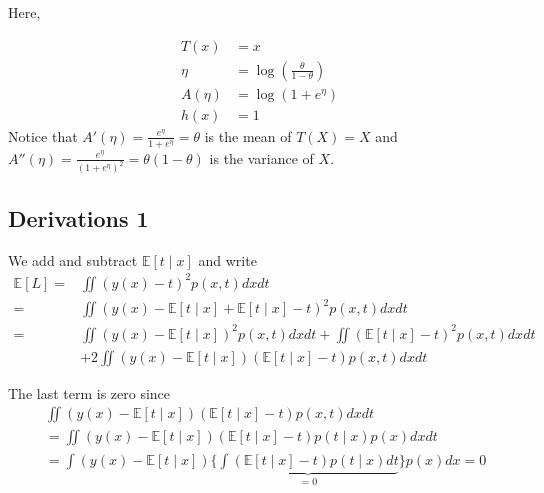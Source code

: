 Here,

\begin{align*}
    T(x) &= x \\
    \eta &= \log \left( \frac{\theta}{1 - \theta} \right) \\
    A(\eta) &= \log(1 + e^{\eta}) \\
    h(x) &= 1
\end{align*}
Notice that \( A'(\eta) = \frac{e^\eta}{1 + e^\eta} = \theta \) is the mean of \( T(X) = X \) and \( A''(\eta) = \frac{e^\eta}{(1 + e^\eta)^2} = \theta (1 - \theta) \) is the variance of \( X \).

\subsection{Derivations 1}
\label{derivations-1}
We add and subtract $\mathbb{E}[t \mid x]$ and write
$$
\begin{aligned}
\mathbb{E}[L]= & \iint(y(x)-t)^2 p(x, t) d x d t \\
= & \iint(y(x)-\mathbb{E}[t \mid x]+\mathbb{E}[t \mid x]-t)^2 p(x, t) d x d t \\
= & \iint(y(x)-\mathbb{E}[t \mid x])^2 p(x, t) d x d t+\iint(\mathbb{E}[t \mid x]-t)^2 p(x, t) d x d t \\
& +2 \iint(y(x)-\mathbb{E}[t \mid x])(\mathbb{E}[t \mid x]-t) p(x, t) d x d t
\end{aligned}
$$

The last term is zero since
$$
\begin{aligned}
& \iint(y(x)-\mathbb{E}[t \mid x])(\mathbb{E}[t \mid x]-t) p(x, t) d x d t \\
& =\iint(y(x)-\mathbb{E}[t \mid x])(\mathbb{E}[t \mid x]-t) p(t \mid x) p(x) d x d t \\
& =\int(y(x)-\mathbb{E}[t \mid x])\{\underbrace{\int(\mathbb{E}[t \mid x]-t) p(t \mid x) d t}_{=0}\} p(x) d x=0
\end{aligned}
$$